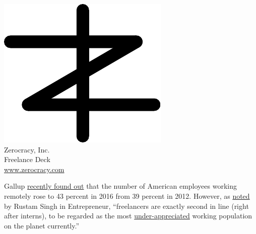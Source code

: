 \documentclass{article}
\begin{document}

\pagecolor{white}
\newcommand\slide[1]{%
  \pagebreak\topskip0pt\vspace*{\fill}%
  \begin{center}\Huge%
  #1
  \end{center}%
  \vspace*{\fill}%
}

\slide{\includegraphics[scale=1]{../images/zerocracy-logo.pdf}\\
Zerocracy, Inc.\\[1em]
\large
Freelance Deck\\
\href{https://www.zerocracy.com}{www.zerocracy.com}}

\newcommand\topic[3]{\vbox{\raggedright{\normalsize\colorbox{#1}{\color{white}{#2}}}\newline\footnotesize#3\vspace{4pt}}}

\slide{
  Gallup \href{https://www.cnbc.com/2018/05/30/70-percent-of-people-globally-work-remotely-at-least-once-a-week-iwg-study.html}{recently found out}
  that the number of American employees
  working remotely rose to 43 percent in 2016 from 39 percent in 2012.
  However, as \href{https://www.entrepreneur.com/article/280749}{noted}
  by Rustam Singh in Entrepreneur,
  ``freelancers are exactly second in line (right after interns),
  to be regarded as the most \underline{under-appreciated} working population
  on the planet currently.''
}
\end{document}

